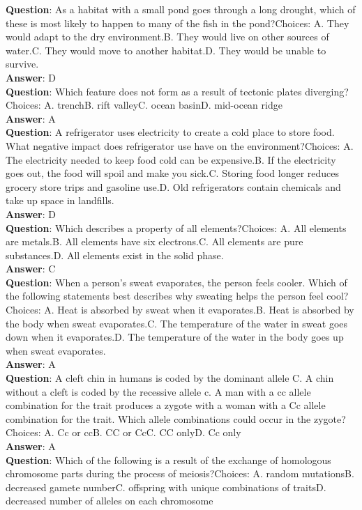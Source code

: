 \textbf{Question}: As a habitat with a small pond goes through a long drought, which of these is most likely to happen to many of the fish in the pond?Choices: A. They would adapt to the dry environment.B. They would live on other sources of water.C. They would move to another habitat.D. They would be unable to survive.\\
\textbf{Answer}: D\\
\textbf{Question}: Which feature does not form as a result of tectonic plates diverging?Choices: A. trenchB. rift valleyC. ocean basinD. mid-ocean ridge\\
\textbf{Answer}: A\\
\textbf{Question}: A refrigerator uses electricity to create a cold place to store food. What negative impact does refrigerator use have on the environment?Choices: A. The electricity needed to keep food cold can be expensive.B. If the electricity goes out, the food will spoil and make you sick.C. Storing food longer reduces grocery store trips and gasoline use.D. Old refrigerators contain chemicals and take up space in landfills.\\
\textbf{Answer}: D\\
\textbf{Question}: Which describes a property of all elements?Choices: A. All elements are metals.B. All elements have six electrons.C. All elements are pure substances.D. All elements exist in the solid phase.\\
\textbf{Answer}: C\\
\textbf{Question}: When a person's sweat evaporates, the person feels cooler. Which of the following statements best describes why sweating helps the person feel cool?Choices: A. Heat is absorbed by sweat when it evaporates.B. Heat is absorbed by the body when sweat evaporates.C. The temperature of the water in sweat goes down when it evaporates.D. The temperature of the water in the body goes up when sweat evaporates.\\
\textbf{Answer}: A\\
\textbf{Question}: A cleft chin in humans is coded by the dominant allele C. A chin without a cleft is coded by the recessive allele c. A man with a cc allele combination for the trait produces a zygote with a woman with a Cc allele combination for the trait. Which allele combinations could occur in the zygote?Choices: A. Cc or ccB. CC or CcC. CC onlyD. Cc only\\
\textbf{Answer}: A\\
\textbf{Question}: Which of the following is a result of the exchange of homologous chromosome parts during the process of meiosis?Choices: A. random mutationsB. decreased gamete numberC. offspring with unique combinations of traitsD. decreased number of alleles on each chromosome\\
